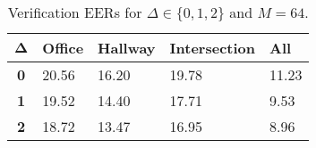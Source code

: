 \begin{table}[h]
    \centering
    \begin{tabular}{|c|M{2cm}|M{2cm}|M{2cm}|M{2cm}|}
    \hline
    $\boldsymbol{\Delta}$ & \bf{Office} & \bf{Hallway} & \bf{Intersection} & \bf{All} \\ 
    \hline 
    \hline
    \bf{0} & 20.56 & 16.20 & 19.78 & 11.23 \\
    \hline
    \bf{1} & 19.52 & 14.40 & 17.71 & 9.53 \\
    \hline
    \bf{2} & 18.72 & 13.47 & 16.95 & 8.96 \\
    \hline
    \end{tabular}
    \caption{Verification EERs for $\Delta \in \{0, 1, 2\}$ and $M = 64$.}
    \label{tab:verify_adapted_wm_M_64}
\end{table}
